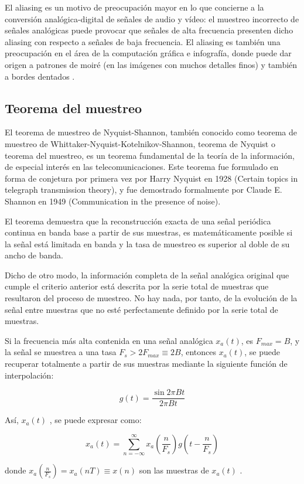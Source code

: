 \documentclass[comsoc, journal]{IEEEtran}
\begin{document}
El aliasing es un motivo de preocupación mayor en lo que concierne a la conversión analógica-digital de señales de audio y vídeo: el muestreo incorrecto de señales analógicas puede provocar que señales de alta frecuencia presenten dicho aliasing con respecto a señales de baja frecuencia. El aliasing es también una preocupación en el área de la computación gráfica e infografía, donde puede dar origen a patrones de moiré (en las imágenes con muchos detalles finos) y también a bordes dentados \cite{serway}.

\subsection{Teorema del muestreo}
El teorema de muestreo de Nyquist-Shannon, también conocido como teorema de muestreo de Whittaker-Nyquist-Kotelnikov-Shannon, teorema de Nyquist o teorema del muestreo, es un teorema fundamental de la teoría de la información, de especial interés en las telecomunicaciones. Este teorema fue formulado en forma de conjetura por primera vez por Harry Nyquist en 1928 (Certain topics in telegraph transmission theory), y fue demostrado formalmente por Claude E. Shannon en 1949 (Communication in the presence of noise).

El teorema demuestra que la reconstrucción exacta de una señal periódica continua en banda base a partir de sus muestras, es matemáticamente posible si la señal está limitada en banda y la tasa de muestreo es superior al doble de su ancho de banda.

Dicho de otro modo, la información completa de la señal analógica original que cumple el criterio anterior está descrita por la serie total de muestras que resultaron del proceso de muestreo. No hay nada, por tanto, de la evolución de la señal entre muestras que no esté perfectamente definido por la serie total de muestras.

Si la frecuencia más alta contenida en una señal analógica $x_a(t)$, es $F_{max}=B$, y la señal se muestrea a una tasa $F_s>2F_{max} \equiv 2B$, entonces $x_a(t)$, se puede recuperar totalmente a partir de sus muestras mediante la siguiente función de interpolación:

$$g(t) = \frac{\sin 2 \pi B t}{2 \pi B t}$$

Así, $x_a(t)$ , se puede expresar como:

$$x_a(t) = \sum_{n=-\infty}^{\infty} x_a \left(\frac{n}{F_s}\right) g \left(t-\frac{n}{F_s}\right)$$

donde $x_a \left(\frac{n}{F_s}\right)= x_a \left(nT\right) \equiv x \left(n\right)$ son las muestras de $x_a \left(t\right)$ \cite{nyquist}.
\end{document}
